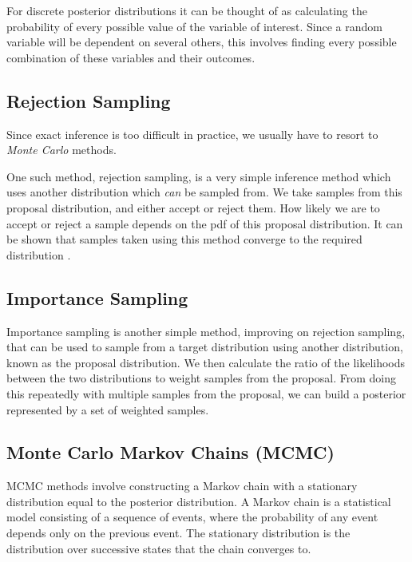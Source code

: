For discrete posterior distributions it can be thought of as calculating the probability of every possible value of the variable of interest. Since a random variable will be dependent on several others, this involves finding every possible combination of these variables and their outcomes.

\subsection{Rejection Sampling}

Since exact inference is too difficult in practice, we usually have to resort to \textit{Monte Carlo} \cite{monte-carlo} methods.

One such method, rejection sampling, is a very simple inference method which uses another distribution which \textit{can} be sampled from. We take samples from this proposal distribution, and either accept or reject them. How likely we are to accept or reject a sample depends on the pdf of this proposal distribution. It can be shown that samples taken using this method converge to the required distribution \cite{}.

\subsection{Importance Sampling}

Importance sampling is another simple method, improving on rejection sampling, that can be used to sample from a target distribution using another distribution, known as the proposal distribution. We then calculate the ratio of the likelihoods between the two distributions to weight samples from the proposal. From doing this repeatedly with multiple samples from the proposal, we can build a posterior represented by a set of weighted samples.


\subsection{Monte Carlo Markov Chains (MCMC)}

MCMC methods involve constructing a Markov chain with a stationary distribution equal to the posterior distribution. A Markov chain is a statistical model consisting of a sequence of events, where the probability of any event depends only on the previous event. The stationary distribution is the distribution over successive states that the chain converges to.

